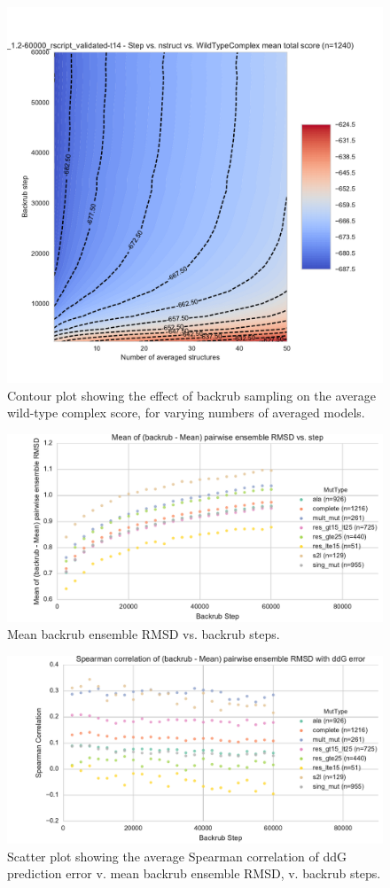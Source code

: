 \begin{figure}
  \includegraphics[width=\textwidth,keepaspectratio]{figures/wildtypecomplex-scores-complete.pdf}
  \caption{
    Contour plot showing the effect of backrub sampling on the average wild-type complex score, for varying numbers of averaged models.
  } \label{fig:wildtypecomplex-scores-complete}
\end{figure}

\begin{figure}
  \includegraphics[width=\textwidth,keepaspectratio]{figures/t14-mean-ensemble-error.pdf}
  \caption{
    Mean backrub ensemble RMSD vs. backrub steps.
  } \label{fig:t14-mean-ensemble-error}
\end{figure}

\begin{figure}
  \includegraphics[width=\textwidth,keepaspectratio]{figures/t14-spear-corr.pdf}
  \caption{
    Scatter plot showing the average Spearman correlation of ddG prediction error v. mean backrub ensemble RMSD, v. backrub steps.
  } \label{fig:spear-corr-rmsd-error}
\end{figure}